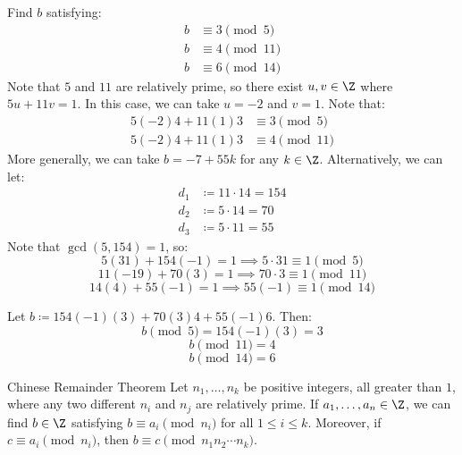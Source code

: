 \begin{exbox}{}{}
    Find $b$ satisfying:
    \begin{align*}
        b &\equiv 3 \pmod{5} \\
        b &\equiv 4 \pmod{11} \\
        b &\equiv 6 \pmod{14}
    \end{align*}
    Note that $5$ and $11$ are relatively prime, so there exist $u,v \in \Z$ where $5u + 11v = 1$. In this case, we can take $u = -2$ and $v = 1$. Note that:
    \begin{align*}
        5(-2)4 + 11(1)3 &\equiv 3 \pmod{5} \\
        5(-2)4 + 11(1)3 &\equiv 4 \pmod{11}
    \end{align*}
    More generally, we can take $b = -7 + 55k$ for any $k \in \Z$.
    \tcblower
    Alternatively, we can let:
    \begin{align*}
        d_1 &\coloneq 11 \cdot 14 = 154 \\
        d_2 &\coloneq 5 \cdot 14 = 70 \\
        d_3 &\coloneq 5 \cdot 11 = 55
    \end{align*}
    Note that $\gcd(5, 154) = 1$, so:
    \[ 5(31) + 154(-1) = 1 \implies 5 \cdot 31 \equiv 1 \pmod{5} \]
    \[11(-19) + 70(3) = 1 \implies 70 \cdot 3 \equiv 1 \pmod{11}\]
    \[ 14(4) + 55(-1) = 1 \implies 55(-1) \equiv 1 \pmod{14} \]

    Let $b \coloneq 154(-1)(3) + 70(3)4 + 55(-1)6$. Then:
    \[ b \pmod{5} = 154(-1)(3) = 3 \]
    \[ b \pmod{11} = 4 \]
    \[ b \pmod{14} = 6 \]
\end{exbox}

\begin{thmbox}{Chinese Remainder Theorem}{}
    Let $n_1, \ldots, n_k$ be positive integers, all greater than $1$, where any two different $n_i$ and $n_j$ are relatively prime. If $a_1, \ldots, a_n \in \Z$, we can find $b \in \Z$ satisfying $b \equiv a_i \pmod{n_i}$ for all $1 \leq i \leq k$. Moreover, if $c \equiv a_i \pmod{n_i}$, then $b \equiv c \pmod{n_1n_2\cdots n_k}$.
    \tcblower

\end{thmbox}
